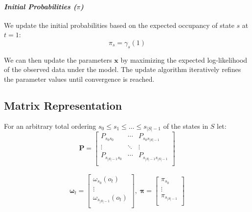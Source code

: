 \paragraph*{\textit{Initial Probabilities ($\pi$)}}

We update the initial probabilities based on the expected occupancy of state $s$ at $t = 1$:
\begin{equation}
    \pi_s = \gamma_s(1)
    \label{eq:initial-probabilities}
\end{equation}

We can then update the parameters $\mathbf{x}$ by maximizing the expected log-likelihood of the observed data under the model.
The update algorithm iteratively refines the parameter values until convergence is reached.

\subsection{Matrix Representation}\label{subsec:matrixoperations}
For an arbitrary total ordering $s_0 \leq s_1 \leq \dots \leq s_{|S|-1}$ of the states in $S$ let:
\begin{equation}
    \boldsymbol{P} =
    \begin{bmatrix}
        P_{s_0 s_0}      & \cdots & P_{s_0 s_{|S|-1}}      \\
        \vdots           & \ddots & \vdots                 \\
        P_{s_{|S|-1}s_0} & \cdots & P_{s_{|S|-1}s_{|S|-1}} \\
    \end{bmatrix}
    \label{eq:transition-matrix}
\end{equation}

\begin{align}
    \boldsymbol{\omega}_t = \begin{bmatrix}
                                \omega_{s_0}(o_t)       \\
                                \vdots                  \\
                                \omega_{s_{|S|-1}}(o_t) \\
    \end{bmatrix}, \;
    \boldsymbol{\pi} = \begin{bmatrix}
                           \pi_{s_0}       \\
                           \vdots          \\
                           \pi_{s_{|S|-1}} \\
    \end{bmatrix}
\end{align}

